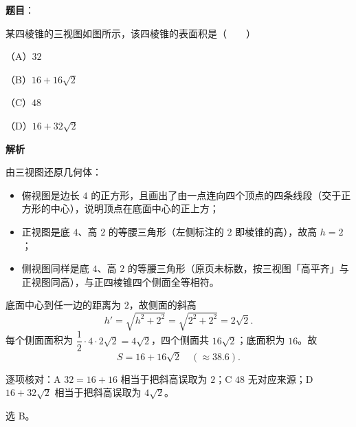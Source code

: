 \begin{answer}

\textbf{题目}：

某四棱锥的三视图如图所示，该四棱锥的表面积是\mbox{（　　）}

（A）$32$

（B）$16+16\sqrt2$

（C）$48$

（D）$16+32\sqrt2$
\nopagebreak[4]
\begin{center}\end{center}
\nopagebreak[4]
\textbf{解析}

由三视图还原几何体：

\begin{itemize}
\item 俯视图是边长 $4$ 的正方形，且画出了由一点连向四个顶点的四条线段（交于正方形的中心），说明顶点在底面中心的正上方；
\item 正视图是底 $4$、高 $2$ 的等腰三角形（左侧标注的 $2$ 即棱锥的高），故高 $h=2$；
\item 侧视图同样是底 $4$、高 $2$ 的等腰三角形（原页未标数，按三视图「高平齐」与正视图同高），与正四棱锥四个侧面全等相符。
\end{itemize}

底面中心到任一边的距离为 $2$，故侧面的斜高
\nopagebreak[4]
\[
h'=\sqrt{h^2+2^2}=\sqrt{2^2+2^2}=2\sqrt2.
\]
每个侧面面积为 $\dfrac12\cdot4\cdot2\sqrt2=4\sqrt2$，四个侧面共 $16\sqrt2$；底面积为 $16$。故
\nopagebreak[4]
\[
S=16+16\sqrt2\quad(\approx38.6).
\]

逐项核对：A $32=16+16$ 相当于把斜高误取为 $2$；C $48$ 无对应来源；D $16+32\sqrt2$ 相当于把斜高误取为 $4\sqrt2$。

选 B。


\end{answer}
